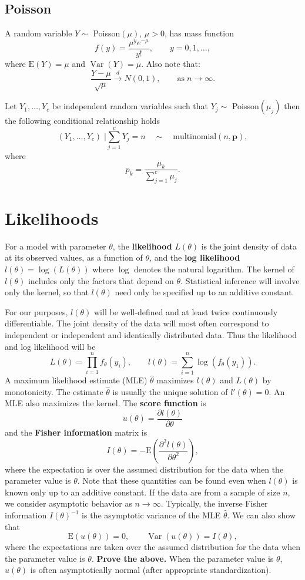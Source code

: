 \documentclass[12pt]{article}
\newcommand{\E}{\mathrm{E}}
\newcommand{\p}{\mathbf{p}}
\DeclareMathOperator{\E}{E}
\DeclareMathOperator{\Var}{Var}
\begin{document}
\subsection*{Poisson}

A random variable $Y \sim$ Poisson$(\mu)$, $\mu > 0$, has mass function 
$$
  f(y) = \frac{\mu^y e^{-\mu}}{y!},  \qquad y = 0,1,\ldots,
$$
where $\E(Y) = \mu$ and $\Var(Y) = \mu$. Also note that:
$$
  \frac{Y - \mu}{\sqrt{\mu}} \overset{d}{\to} N(0,1), 
    \qquad \text{as} \; n \to \infty.
$$

\vspace*{0.5cm}\noindent Let $Y_1,\ldots,Y_c$ be independent random variables such that $Y_j \sim$ Poisson$(\mu_j)$ then the following conditional relationship holds
$$
  (Y_1,\ldots,Y_c)\; \Big| \sum_{j=1}^c Y_j = n \quad \sim \quad 
    \text{multinomial}(n,\p),
$$
where 
$$
  p_k = \frac{\mu_k}{\sum_{j=1}^c \mu_j}.
$$


\section*{Likelihoods}

For a model with parameter $\theta$, the \textbf{likelihood} $L(\theta)$ is the joint density of data at its observed values, as a function of $\theta$, and the \textbf{log likelihood} $l(\theta) = \log(L(\theta))$ where $\log$ denotes the natural logarithm. The kernel of $l(\theta)$ includes only the factors that depend on $\theta$. Statistical inference will involve only the kernel, so that $l(\theta)$ need only be specified up to an additive constant.

For our purposes, $l(\theta)$ will be well-defined and at least twice continuously differentiable. The joint density of the data will most often correspond to independent or independent and identically distributed data. Thus the likelihood and log likelihood will be
$$
  L(\theta) = \prod_{i=1}^n f_\theta(y_i), \qquad 
    l(\theta) = \sum_{i=1}^n \log(f_\theta(y_1)).
$$
A maximum likelihood estimate (MLE) $\hat\theta$ maximizes $l(\theta)$ and $L(\theta)$ by monotonicity. The estimate $\hat\theta$ is usually the unique solution of $l'(\theta) = 0$. An MLE also maximizes the kernel. The \textbf{score function} is
$$
  u(\theta) = \frac{\partial l(\theta)}{\partial\theta}
$$
and the \textbf{Fisher information} matrix is 
$$
  I(\theta) = -\E\left(\frac{\partial^2 l(\theta)}{\partial \theta^2}\right),
$$
where the expectation is over the assumed distribution for the data when the parameter value is $\theta$. Note that these quantities can be found even when $l(\theta)$ is known only up to an additive constant. If the data are from a sample of size $n$, we consider asymptotic behavior as $n\to\infty$. Typically, the inverse Fisher information $I(\theta)^{-1}$ is the asymptotic variance of the MLE $\hat\theta$. We can also show that
$$
  \E(u(\theta)) = 0, \qquad \Var(u(\theta)) = I(\theta),
$$
where the expectations are taken over the assumed distribution for the data when the parameter value is $\theta$. \textbf{Prove the above.} When the parameter value is $\theta$, $u(\theta)$ is often asymptotically normal (after appropriate standardization).
\end{document}
